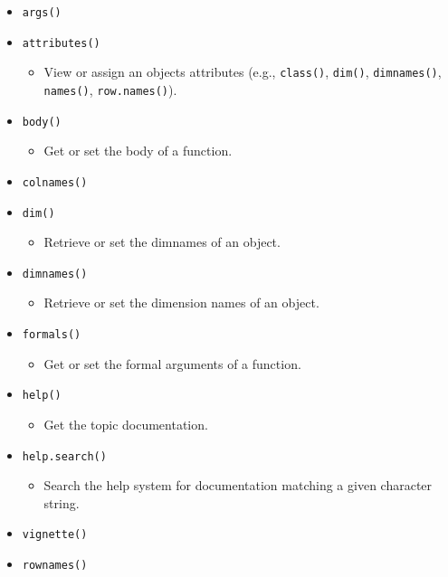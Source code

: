 \documentclass[
]{book}
\providecommand{\tightlist}{%
  \setlength{\itemsep}{0pt}\setlength{\parskip}{0pt}}
\begin{document}
\begin{itemize}
\tightlist
\item
  \texttt{args()}
\item
  \texttt{attributes()}

  \begin{itemize}
  \tightlist
  \item
    View or assign an objects attributes (e.g., \texttt{class()}, \texttt{dim()}, \texttt{dimnames()}, \texttt{names()}, \texttt{row.names()}).
  \end{itemize}
\item
  \texttt{body()}

  \begin{itemize}
  \tightlist
  \item
    Get or set the body of a function.
  \end{itemize}
\item
  \texttt{colnames()}
\item
  \texttt{dim()}

  \begin{itemize}
  \tightlist
  \item
    Retrieve or set the dimnames of an object.
  \end{itemize}
\item
  \texttt{dimnames()}

  \begin{itemize}
  \tightlist
  \item
    Retrieve or set the dimension names of an object.
  \end{itemize}
\item
  \texttt{formals()}

  \begin{itemize}
  \tightlist
  \item
    Get or set the formal arguments of a function.
  \end{itemize}
\item
  \texttt{help()}

  \begin{itemize}
  \tightlist
  \item
    Get the topic documentation.
  \end{itemize}
\item
  \texttt{help.search()}

  \begin{itemize}
  \tightlist
  \item
    Search the help system for documentation matching a given character string.
  \end{itemize}
\item
  \texttt{vignette()}
\item
  \texttt{rownames()}
\end{itemize}
\end{document}
